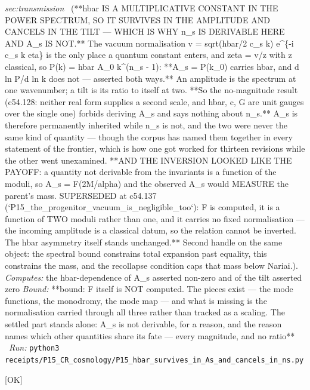 \begin{description}
\textit{sec:transmission} \ (**hbar IS A MULTIPLICATIVE CONSTANT IN THE POWER SPECTRUM, SO IT SURVIVES IN THE AMPLITUDE AND CANCELS IN THE TILT --- WHICH IS WHY n\_s IS DERIVABLE HERE AND A\_s IS NOT.** The vacuum normalisation v = sqrt(hbar/2 c\_s k) e\textasciicircum{}\{-i c\_s k eta\} is the only place a quantum constant enters, and zeta = v/z with z classical, so P(k) = hbar A\_0 k\textasciicircum{}(n\_s - 1): **A\_s = P(k\_0) carries hbar, and d ln P/d ln k does not --- asserted both ways.** An amplitude is the spectrum at one wavenumber; a tilt is its ratio to itself at two. **So the no-magnitude result (c54.128: neither real form supplies a second scale, and hbar, c, G are unit gauges over the single one) forbids deriving A\_s and says nothing about n\_s.** A\_s is therefore permanently inherited while n\_s is not, and the two were never the same kind of quantity --- though the corpus has named them together in every statement of the frontier, which is how one got worked for thirteen revisions while the other went unexamined. **AND THE INVERSION LOOKED LIKE THE PAYOFF: a quantity not derivable from the invariants is a function of the moduli, so A\_s = F(2M/alpha) and the observed A\_s would MEASURE the parent's mass. SUPERSEDED at c54.137 (`P15\_the\_progenitor\_vacuum\_is\_negligible\_too`): F is computed, it is a function of TWO moduli rather than one, and it carries no fixed normalisation --- the incoming amplitude is a classical datum, so the relation cannot be inverted. The hbar asymmetry itself stands unchanged.** Second handle on the same object: the spectral bound constrains total expansion past equality, this constrains the mass, and the recollapse condition caps that mass below Nariai.). 
\emph{Computes:} the hbar-dependence of A\_s asserted non-zero and of the tilt asserted zero
 \emph{Bound:} **bound: F itself is NOT computed. The pieces exist --- the mode functions, the monodromy, the mode map --- and what is missing is the normalisation carried through all three rather than tracked as a scaling. The settled part stands alone: A\_s is not derivable, for a reason, and the reason names which other quantities share its fate --- every magnitude, and no ratio**
\ \emph{Run:} \texttt{python3 receipts/P15\_CR\_cosmology/P15\_hbar\_survives\_in\_As\_and\_cancels\_in\_ns.py}
\item[\rcptlabel{I11_I1_one_condition_two_jobs_and_the_two_routes_are_independent}{P15R87}\textbf{P15R87}\quad\texttt{I11\_I1\_one\_condition\_two\_jobs\_and\_the\_two\_routes\_are\_independent}]\hfill\textsf{[OK]}\\

\end{description}
